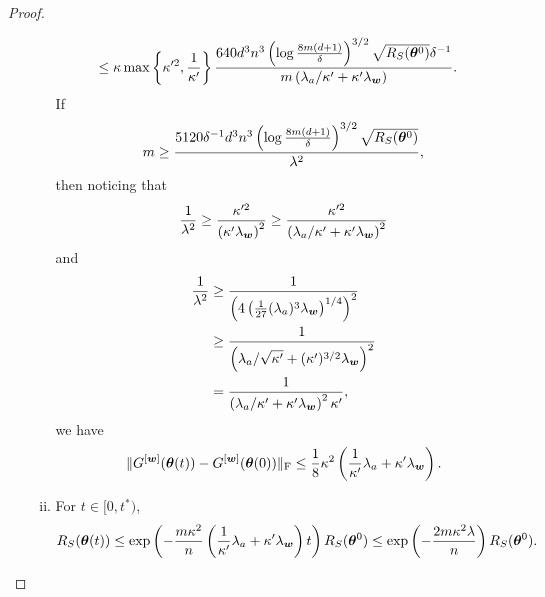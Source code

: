 \documentclass[twoside,11pt]{article}
\begin{document}
\begin{proof}
\begin{enumerate}[(a)]
\begin{enumerate}[(i)]
\begin{equation*}
\begin{aligned}
                                 & \leq\kappa\max\left\{\kappa'^2,\frac{1}{\kappa'}\right\}\frac{640 d^3n^3\left(\log\frac{8m(d+1)}{\delta}\right)^{3/2}\sqrt{R_S(\bm{\theta}^0)}\delta^{-1}}{m\left(\lambda_a/\kappa'+\kappa'\lambda_{\bm{w}}\right)}.
                            \end{aligned}
                        \end{equation*}
                        If
                        \begin{equation*}
                            m\geq\frac{5120\delta^{-1}d^3n^3\left(\log\frac{8m(d+1)}{\delta}\right)^{3/2}\sqrt{R_S(\bm{\theta}^0)}}{\lambda^2},
                        \end{equation*}
                        then noticing that
                        \begin{equation*}
                            \frac{1}{\lambda^2} \geq\frac{\kappa'^2}{\left(\kappa'\lambda_{\bm{w}}\right)^2} \geq\frac{\kappa'^2}{\left(\lambda_a/\kappa'+\kappa'\lambda_{\bm{w}}\right)^2}
                        \end{equation*}
                        and
                        \begin{equation*}
                            \begin{aligned}
                                \frac{1}{\lambda^2}
                                 & \geq\frac{1}{\left(4\left(\frac{1}{27}(\lambda_a)^3\lambda_{\bm{w}}\right)^{1/4}\right) ^2}\\
                                 & \geq\frac{1}{\left(\lambda_a/\sqrt{\kappa'}+(\kappa')^{3/2}\lambda_{\bm{w}}\right)^2}\\
                                 & =\frac{1}{\left(\lambda_a/\kappa'+\kappa'\lambda_{\bm{w}}\right)^2\kappa'},
                            \end{aligned}
                        \end{equation*}
                        we have \begin{equation}\label{thm-proof:step2}
                            \lVert G^{[\bm{w}]}(\bm{\theta}(t))-G^{[\bm{w}]}(\bm{\theta}(0))\rVert_\mathrm{F}\leq\frac{1}{8}\kappa^2\left(\frac{1}{\kappa'}\lambda_a+\kappa'\lambda_{\bm{w}}\right).
                        \end{equation}
                  \item For $t\in[0,t^*)$,
                        \begin{equation*}
                            \RS(\vtheta(t))\leq\exp\left(-\frac{m\kappa^2}{n}\left(\frac{1}{\kappa'}\lambda_a+\kappa'\lambda_{\vw}\right)t\right)\RS(\vtheta^0)\leq\exp\left(-\frac{2m\kappa^2\lambda}{n}\right)\RS(\vtheta^0).

\end{equation*}
\end{enumerate}
\end{enumerate}
\end{proof}
\end{document}
